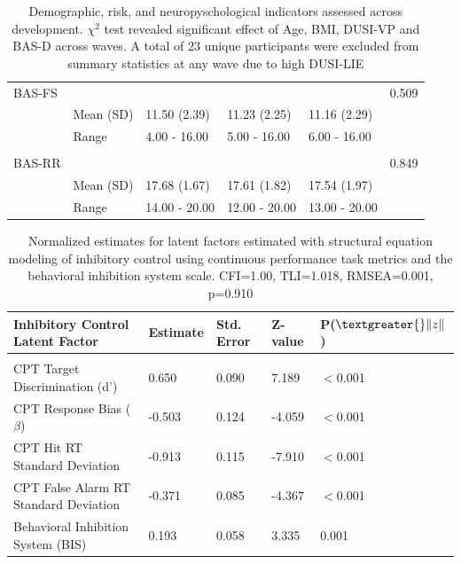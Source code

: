 \documentclass{article}%
\begin{document}
\begin{table}[h!]
\begin{tabular}{llllll}
BAS-FS     &                 &                  &                  &                  & 0.509                    \\
                    & Mean (SD)       & 11.50 (2.39)   & 11.23 (2.25)   & 11.16 (2.29)   &                          \\
                    & Range           & 4.00 - 16.00   & 5.00 - 16.00   & 6.00 - 16.00 &                          \\ \hline \\
BAS-RR         &                 &                  &                  &                  & 0.849                    \\
                    & Mean (SD)       & 17.68 (1.67)   & 17.61 (1.82)   & 17.54 (1.97)   &                          \\
                    & Range           & 14.00 - 20.00 & 12.00 - 20.00  & 13.00 - 20.00   &
\end{tabular}
\caption{Demographic, risk, and neuropyschological indicators assessed across development. $\chi^2$ test revealed significant effect of Age, BMI, DUSI-VP and BAS-D across waves. A total of $23$ unique participants were excluded from summary statistics at any wave due to high DUSI-LIE\label{tab:1}}
\end{table}
\begin{table}[h!]
\begin{tabular}{lllll}
Inhibitory Control Latent Factor                                               & Estimate & Std. Error & Z-value & P($\textgreater{}\|z\|$) \\ \hline \\
CPT Target Discrimination (d')         & 0.650 & 0.090      & 7.189  & $<$0.001                \\ 
CPT Response Bias ($\beta$)                  & -0.503   & 0.124      & -4.059  & $<$0.001         \\ 
CPT Hit RT Standard Deviation                           & -0.913    & 0.115      & -7.910   & $<$0.001 \\
CPT False Alarm RT Standard Deviation                       & -0.371   & 0.085      & -4.367  & $<$0.001 \\ 
Behavioral Inhibition System (BIS)                             & 0.193    & 0.058      & 3.335   & 0.001
\end{tabular}
\caption{Normalized estimates for latent factors estimated with structural equation modeling of inhibitory control using continuous performance task metrics and the behavioral inhibition system scale. CFI=1.00, TLI=1.018, RMSEA=0.001, p=0.910\label{tab:2}}
\end{table}
\end{document}
